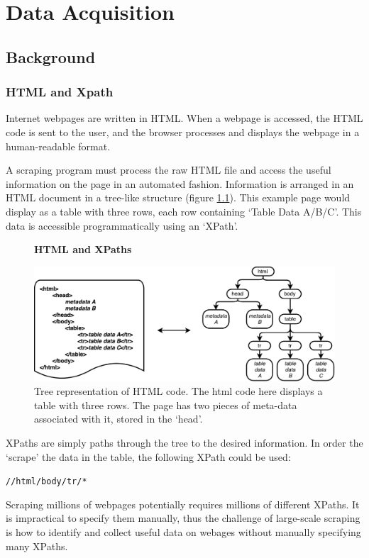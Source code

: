 \chapter{Data Acquisition}
\label{chapt:DATA_ACQUISITION}
\section{Background}
\subsection{HTML and Xpath}

Internet webpages are written in HTML. When a webpage is accessed, the HTML code is sent to the user, and the browser processes and displays the webpage in a human-readable format. 

A scraping program must process the raw HTML file and access the useful information on the page in an automated fashion. Information is arranged in an HTML document in a tree-like structure (figure \ref{fig:HTMLTREE}). This example page would display as a table with three rows, each row containing `Table Data A/B/C'. This data is accessible programmatically using an `XPath'. 
\begin{figure}[H]
    \centering
    \textbf{HTML and XPaths}\par\medskip
    \includegraphics[width=\textwidth]{Data_Acquisition/html_tree.pdf}
    \caption[Tree representation of HTML Code]{Tree representation of HTML code. The html code here displays a table with three rows. The page has two pieces of meta-data associated with it, stored in the `head'.}
\label{fig:HTMLTREE}
\end{figure}
XPaths are simply paths through the tree to the desired information. In order the `scrape' the data in the table, the following XPath could be used:
\begin{center}
\texttt{//html/body/tr/*}
\end{center}
Scraping millions of webpages potentially requires millions of different XPaths. It is impractical to specify them manually, thus the challenge of large-scale scraping is how to identify and collect useful data on webages without manually specifying many XPaths.
